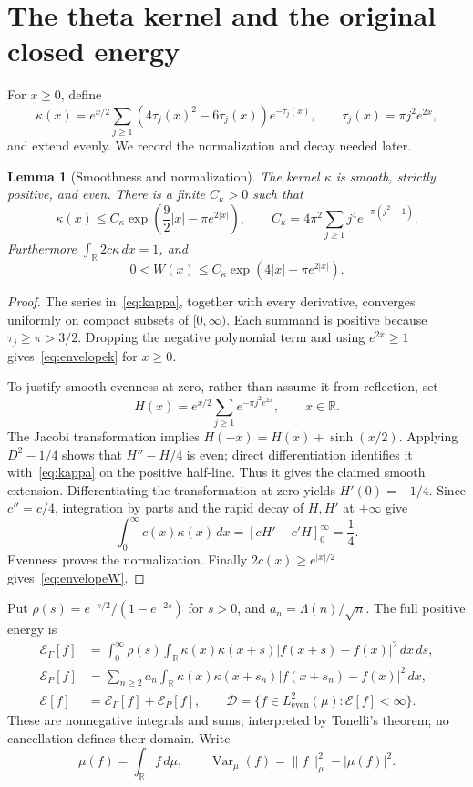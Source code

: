 \documentclass[11pt,a4paper]{article}
\numberwithin{equation}{section}
\newtheorem{lemma}[theorem]{Lemma}
\theoremstyle{remark}
\newcommand{\R}{\mathbb R}
\newcommand{\E}{\mathcal E}
\newcommand{\D}{\mathcal D}
\newcommand{\He}{L^2_{\mathrm{even}}(\mu)}
\newcommand{\Var}{\operatorname{Var}}
\newcommand{\norm}[1]{\lVert #1\rVert}
\begin{document}
\section{The theta kernel and the original closed energy}\label{sec:energy}

For $x\ge0$, define
\begin{equation}\label{eq:kappa}
 \kappa(x)=e^{x/2}\sum_{j\ge1}(4\tau_j(x)^2-6\tau_j(x))e^{-\tau_j(x)},
 \qquad \tau_j(x)=\pi j^2e^{2x},
\end{equation}
and extend evenly. We record the normalization and decay needed later.

\begin{lemma}[Smoothness and normalization]\label{lem:theta}
The kernel $\kappa$ is smooth, strictly positive, and even. There is a finite $C_\kappa>0$ such that
\begin{equation}\label{eq:envelopek}
 \kappa(x)\le C_\kappa\exp\!\left(\frac92|x|-\pi e^{2|x|}\right),
 \qquad
 C_\kappa=4\pi^2\sum_{j\ge1}j^4e^{-\pi(j^2-1)}.
\end{equation}
Furthermore $\int_\R2c\kappa\,dx=1$, and
\begin{equation}\label{eq:envelopeW}
 0<W(x)\le C_\kappa\exp(4|x|-\pi e^{2|x|}).
\end{equation}
\end{lemma}
\begin{proof}
The series in~\eqref{eq:kappa}, together with every derivative, converges uniformly on compact subsets of $[0,\infty)$. Each summand is positive because $\tau_j\ge\pi>3/2$. Dropping the negative polynomial term and using $e^{2x}\ge1$ gives~\eqref{eq:envelopek} for $x\ge0$.

To justify smooth evenness at zero, rather than assume it from reflection, set
\[
 H(x)=e^{x/2}\sum_{j\ge1}e^{-\pi j^2e^{2x}},\qquad x\in\R.
\]
The Jacobi transformation \cite[Eq.~20.7.32]{DLMF} implies
$H(-x)=H(x)+\sinh(x/2)$. Applying $D^2-1/4$ shows that $H''-H/4$ is even; direct differentiation identifies it with~\eqref{eq:kappa} on the positive half-line. Thus it gives the claimed smooth extension. Differentiating the transformation at zero yields $H'(0)=-1/4$. Since $c''=c/4$, integration by parts and the rapid decay of $H,H'$ at $+\infty$ give
\[
 \int_0^\infty c(x)\kappa(x)\,dx
  =[cH'-c'H]_0^\infty=\frac14.
\]
Evenness proves the normalization. Finally $2c(x)\ge e^{|x|/2}$ gives~\eqref{eq:envelopeW}.
\end{proof}

Put $\rho(s)=e^{-s/2}/(1-e^{-2s})$ for $s>0$, and $a_n=\Lambda(n)/\sqrt n$. The full positive energy is
\begin{align}
 \E_\Gamma[f]&=\int_0^\infty\rho(s)\int_\R
       \kappa(x)\kappa(x+s)|f(x+s)-f(x)|^2\,dx\,ds,\label{eq:Eg}\\
 \E_P[f]&=\sum_{n\ge2}a_n\int_\R
       \kappa(x)\kappa(x+s_n)|f(x+s_n)-f(x)|^2\,dx,\label{eq:Ep}\\
 \E[f]&=\E_\Gamma[f]+\E_P[f],\qquad
 \D=\{f\in\He:\E[f]<\infty\}.\label{eq:Edomain}
\end{align}
These are nonnegative integrals and sums, interpreted by Tonelli's theorem; no cancellation defines their domain. Write
\[
 \mu(f)=\int_\R f\,d\mu,\qquad
 \Var_\mu(f)=\norm{f}_\mu^2-|\mu(f)|^2.
\]
\end{document}
